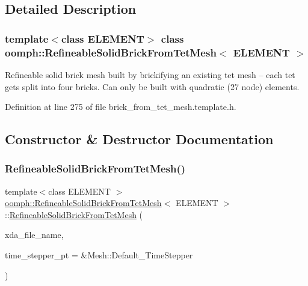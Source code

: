 \subsection{Detailed Description}
\subsubsection*{template$<$class E\+L\+E\+M\+E\+NT$>$\newline
class oomph\+::\+Refineable\+Solid\+Brick\+From\+Tet\+Mesh$<$ E\+L\+E\+M\+E\+N\+T $>$}

Refineable solid brick mesh built by brickifying an existing tet mesh -- each tet gets split into four bricks. Can only be built with quadratic (27 node) elements. 

Definition at line 275 of file brick\+\_\+from\+\_\+tet\+\_\+mesh.\+template.\+h.



\subsection{Constructor \& Destructor Documentation}
\mbox{\label{classoomph_1_1RefineableSolidBrickFromTetMesh_a21676e62a225b6d698af7a58de4e3553}} 
\subsubsection{\texorpdfstring{Refineable\+Solid\+Brick\+From\+Tet\+Mesh()}{RefineableSolidBrickFromTetMesh()}\hspace{0.1cm}{\footnotesize\ttfamily [1/2]}}
{\footnotesize\ttfamily template$<$class E\+L\+E\+M\+E\+NT $>$ \\
\hyperlink{classoomph_1_1RefineableSolidBrickFromTetMesh}{oomph\+::\+Refineable\+Solid\+Brick\+From\+Tet\+Mesh}$<$ E\+L\+E\+M\+E\+NT $>$\+::\hyperlink{classoomph_1_1RefineableSolidBrickFromTetMesh}{Refineable\+Solid\+Brick\+From\+Tet\+Mesh} (\begin{DoxyParamCaption}\item[{const std\+::string}]{xda\+\_\+file\+\_\+name,  }\item[{Time\+Stepper $\ast$}]{time\+\_\+stepper\+\_\+pt = {\ttfamily \&Mesh\+:\+:Default\+\_\+TimeStepper} }\end{DoxyParamCaption})\hspace{0.3cm}{\ttfamily [inline]}}



